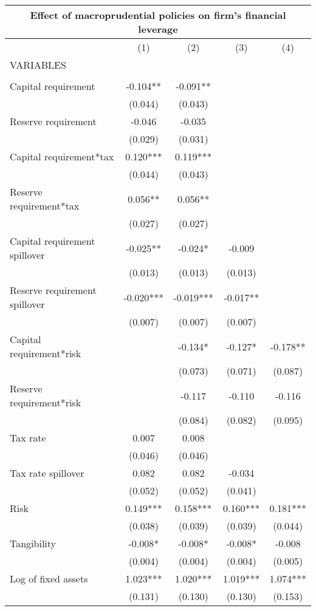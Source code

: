 \begin{tabular}{lcccc}
\multicolumn{5}{c}{Effect of macroprudential policies on firm's financial leverage} \\ \hline
 & (1) & (2) & (3) & (4) \\
VARIABLES &  &  &  &  \\ \hline
 &  &  &  &  \\
Capital requirement & -0.104** & -0.091** &  &  \\
 & (0.044) & (0.043) &  &  \\
Reserve requirement & -0.046 & -0.035 &  &  \\
 & (0.029) & (0.031) &  &  \\
Capital requirement*tax & 0.120*** & 0.119*** &  &  \\
 & (0.044) & (0.043) &  &  \\
Reserve requirement*tax & 0.056** & 0.056** &  &  \\
 & (0.027) & (0.027) &  &  \\
Capital requirement spillover & -0.025** & -0.024* & -0.009 &  \\
 & (0.013) & (0.013) & (0.013) &  \\
Reserve requirement spillover & -0.020*** & -0.019*** & -0.017** &  \\
 & (0.007) & (0.007) & (0.007) &  \\
Capital requirement*risk &  & -0.134* & -0.127* & -0.178** \\
 &  & (0.073) & (0.071) & (0.087) \\
Reserve requirement*risk &  & -0.117 & -0.110 & -0.116 \\
 &  & (0.084) & (0.082) & (0.095) \\
Tax rate & 0.007 & 0.008 &  &  \\
 & (0.046) & (0.046) &  &  \\
Tax rate spillover & 0.082 & 0.082 & -0.034 &  \\
 & (0.052) & (0.052) & (0.041) &  \\
Risk & 0.149*** & 0.158*** & 0.160*** & 0.181*** \\
 & (0.038) & (0.039) & (0.039) & (0.044) \\
Tangibility & -0.008* & -0.008* & -0.008* & -0.008 \\
 & (0.004) & (0.004) & (0.004) & (0.005) \\
Log of fixed assets & 1.023*** & 1.020*** & 1.019*** & 1.074*** \\
 & (0.131) & (0.130) & (0.130) & (0.153) \\

\end{tabular}
